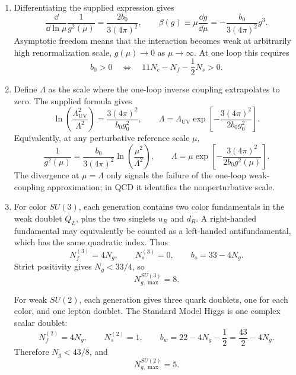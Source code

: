 \begin{enumerate}
  \begin{enumerate}
    \item[(i)] Differentiating the supplied expression gives
    \[
      \frac{\dd}{\dd\ln\mu}\frac{1}{g^2(\mu)}
        =\frac{2b_0}{3(4\pi)^2},
      \qquad
      \beta(g)\equiv\mu\frac{\dd g}{\dd\mu}
        =-\frac{b_0}{3(4\pi)^2}g^3.
    \]
    Asymptotic freedom means that the interaction becomes weak at
    arbitrarily high renormalization scale, \(g(\mu)\to0\) as
    \(\mu\to\infty\).  At one loop this requires
    \[
      \boxed{b_0>0
      \quad\Longleftrightarrow\quad
      11N_c-N_f-\frac12N_s>0.}
    \]

    \item[(ii)] Define \(\Lambda\) as the scale where the one-loop inverse
    coupling extrapolates to zero.  The supplied formula gives
    \[
      \ln\left(\frac{\Lambda_{\mathrm{UV}}^2}{\Lambda^2}\right)
        =\frac{3(4\pi)^2}{b_0g_0^2},
      \qquad
      \boxed{\Lambda=\Lambda_{\mathrm{UV}}
        \exp\left[-\frac{3(4\pi)^2}{2b_0g_0^2}\right].}
    \]
    Equivalently, at any perturbative reference scale \(\mu\),
    \[
      \frac{1}{g^2(\mu)}
        =\frac{b_0}{3(4\pi)^2}
          \ln\left(\frac{\mu^2}{\Lambda^2}\right),
      \qquad
      \Lambda=\mu\exp\left[-
        \frac{3(4\pi)^2}{2b_0g^2(\mu)}\right].
    \]
    The divergence at \(\mu=\Lambda\) only signals the failure of the
    one-loop weak-coupling approximation; in QCD it identifies the
    nonperturbative scale.

    \item[(iii)] For color \(SU(3)\), each generation contains two color
    fundamentals in the weak doublet \(Q_L\), plus the two singlets
    \(u_R\) and \(d_R\).  A right-handed fundamental may equivalently be
    counted as a left-handed antifundamental, which has the same quadratic
    index.  Thus
    \[
      N_f^{(3)}=4N_g,\qquad N_s^{(3)}=0,\qquad
      b_s=33-4N_g.
    \]
    Strict positivity gives \(N_g<33/4\), so
    \[
      \boxed{N_{g,\max}^{SU(3)}=8.}
    \]

    For weak \(SU(2)\), each generation gives three quark doublets, one for
    each color, and one lepton doublet.  The Standard Model Higgs is one
    complex scalar doublet:
    \[
      N_f^{(2)}=4N_g,\qquad N_s^{(2)}=1,\qquad
      b_w=22-4N_g-\frac12=\frac{43}{2}-4N_g.
    \]
    Therefore \(N_g<43/8\), and
    \[
      \boxed{N_{g,\max}^{SU(2)}=5.}
    \]


\end{enumerate}
\end{enumerate}
